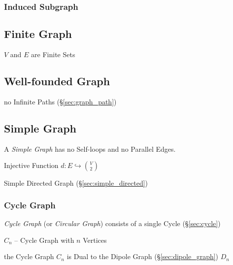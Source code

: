 \subsubsection{Induced Subgraph}\label{sec:induced_subgraph}



\subsection{Finite Graph}\label{sec:finite_graph}

$V$ and $E$ are Finite Sets



\subsection{Well-founded Graph}\label{sec:wellfounded_graph}

no Infinite Paths (\S\ref{sec:graph_path})



\subsection{Simple Graph}\label{sec:simple_graph}

A \emph{Simple Graph} has no Self-loops and no Parallel Edges.

Injective Function $d : E \hookrightarrow {V \choose 2}$

Simple Directed Graph (\S\ref{sec:simple_directed})



\subsubsection{Cycle Graph}\label{sec:cycle_graph}

\emph{Cycle Graph} (or \emph{Circular Graph}) consists of a single
Cycle (\S\ref{sec:cycle})

$C_n$ -- Cycle Graph with $n$ Vertices

the Cycle Graph $C_n$ is Dual to the Dipole Graph
(\S\ref{sec:dipole_graph}) $D_n$



